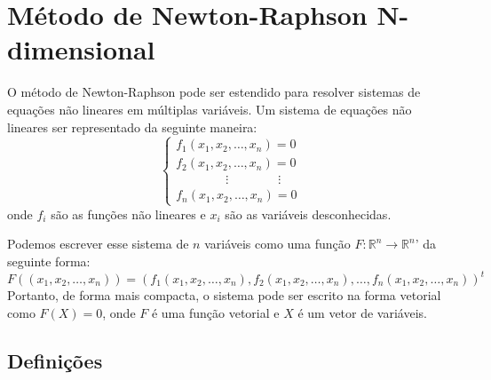 \section{Método de Newton-Raphson N-dimensional}
O método de Newton-Raphson pode ser estendido para resolver sistemas de equações não lineares em múltiplas variáveis. Um sistema de equações não lineares ser representado da seguinte maneira:
\begin{equation*}
    \begin{cases}
    f_1(x_1, x_2, \ldots, x_n) = 0 \\
    f_2(x_1, x_2, \ldots, x_n) = 0 \\
            \qquad \qquad \vdots \qquad \qquad  \vdots \\
    f_n(x_1, x_2, \ldots, x_n) = 0
    \end{cases}
\end{equation*}
onde  \(f_i \) são as funções não lineares e \(x_i\) são as variáveis desconhecidas.

Podemos escrever esse sistema de \textbf{\(n\)} variáveis como uma função \textbf{\(F : \mathbb{R}^n \rightarrow \mathbb{R}^n\)}' da seguinte forma:
\begin{equation*}
    F((x_1, x_2, \ldots, x_n)) = (f_1(x_1, x_2, \ldots, x_n), f_2(x_1, x_2, \ldots, x_n), \ldots, f_n(x_1, x_2, \ldots, x_n))^{t}
\end{equation*}
Portanto, de forma mais compacta, o sistema pode ser escrito na forma vetorial como \textbf{\(F(X) = 0\)}, onde \textbf{\(F\)} é uma função vetorial e \(X\) é um vetor de variáveis.

\subsection{Definições}

